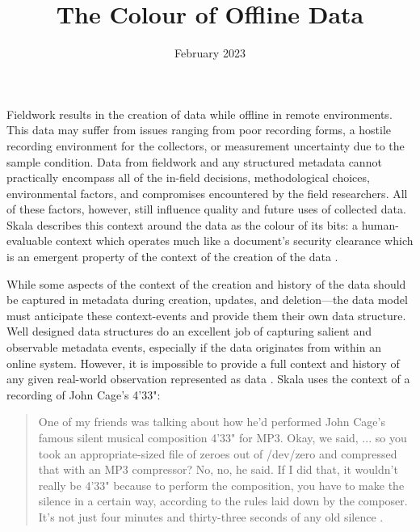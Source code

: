 \documentclass{scrarticle}
\title{The Colour of Offline Data}
\date{February 2023}
\begin{document}
\maketitle
{}





Fieldwork results in the creation of data while offline in remote environments. This data may suffer from issues ranging from poor recording forms, a hostile recording environment for the collectors, or measurement uncertainty due to the sample condition. Data from fieldwork and any structured metadata 
cannot practically encompass all of the in-field decisions, methodological choices, environmental factors, and compromises encountered by the field researchers. All of these factors, however, still influence  quality and future uses of collected data. Skala describes this context around the data as the colour of its bits: a human-evaluable context which operates much like a document's security clearance which is an emergent property of the context of the creation of the data \parencite*{Skala2004-zc}. 

While some aspects of the context of the creation and history of the data should be captured in metadata during creation, updates, and deletion---the data model must anticipate these context-events and provide them their own data structure. Well designed data structures do an excellent job of capturing salient and observable metadata events, especially if the data originates from within an online system. However, it is impossible to provide a full context and history of any given real-world observation represented as data
. Skala uses the context of a recording of John Cage's 4'33":
\begin{quote}
One of my friends was talking about how he'd performed John Cage's famous silent musical composition 4'33" for MP3.  Okay, we said, ... so you took an appropriate-sized file of zeroes out of /dev/zero and compressed that with an MP3 compressor?  No, no, he said.  If I did that, it wouldn't really be 4'33" because to perform the composition, you have to make the silence in a certain way, according to the rules laid down by the composer.  It's not just four minutes and thirty-three seconds of any old silence  \parencite*{Skala2004-zc}.
\end{quote}
\end{document}
